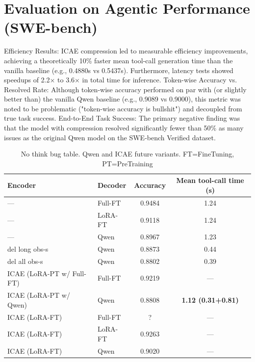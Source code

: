 \section{Evaluation on Agentic Performance (SWE-bench)}

Efficiency Results: ICAE \cite{ge_-context_2024} compression led to measurable efficiency improvements, achieving a theoretically 10\% faster mean tool-call generation time than the vanilla baseline (e.g., 0.4880s vs 0.5437s).
Furthermore, latency tests showed speedups of 2.2× to 3.6× in total time for inference.
Token-wise Accuracy vs. Resolved Rate: Although token-wise accuracy performed on par with (or slightly better than) the vanilla Qwen baseline (e.g., 0.9089 vs 0.9000), this metric was noted to be problematic ("token-wise accuracy is bullshit") and decoupled from true task success.
End-to-End Task Success: The primary negative finding was that the model with compression resolved significantly fewer than 50\% as many issues as the original Qwen model on the SWE-bench Verified dataset.

\begin{table}[h]
    \centering
    \setlength{\tabcolsep}{6pt}
    \begin{tabular}{llcc}
        \toprule
        \textbf{Encoder} & \textbf{Decoder} & \textbf{Accuracy} & \textbf{Mean tool-call time (s)} \\
        \midrule
        —                        & Full-FT   & 0.9484 & 1.24 \\
        —                        & LoRA-FT   & 0.9118 & 1.24 \\
        —                        & Qwen           & 0.8967 & 1.23 \\
        \addlinespace
        del long obs-s             & Qwen           & 0.8873 & 0.44 \\
        del all obs-s              & Qwen           & 0.8802 & 0.39 \\
        \addlinespace
        ICAE (LoRA-PT w/ Full-FT)   & Full-FT   &  0.9219    &  — \\
        ICAE (LoRA-PT w/ Qwen)    & Qwen           &  0.8808 & \textbf{1.12 (0.31+0.81)} \\
        \addlinespace
        ICAE (LoRA-FT)         & Full-FT   &  ?   & —  \\
        ICAE (LoRA-FT)         & LoRA-FT   & 0.9263   & —  \\
        ICAE (LoRA-FT)         & Qwen           & 0.9020 & — \\

        
        \bottomrule
    \end{tabular}
    \caption{No think bug table. Qwen and ICAE future variants. FT=FineTuning, PT=PreTraining}
    \label{tab:icae_variants}
\end{table}

